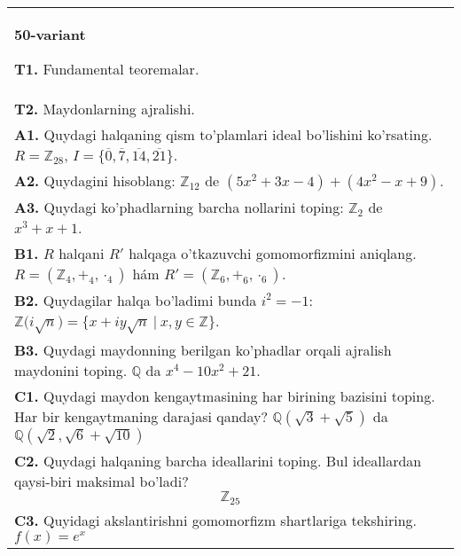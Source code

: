 \documentclass{article}
\begin{document}
\begin{tabular}{m{17cm}}
\textbf{50-variant}
\newline

\textbf{T1.} Fundamental teoremalar. \\
\textbf{T2.} Maydonlarning ajralishi. \\
\textbf{A1.} Quydagi halqaning qism to'plamlari ideal bo'lishini ko'rsating.
\(R = \mathbb{Z}_{28}\), \(I = \{\overline{0},\overline{7},\overline{14},\overline{21}\}\). \\
\textbf{A2.} Quydagini hisoblang:
\(\mathbb{Z}_{12}\) de \(\left( 5x^{2} + 3x - 4 \right) + \left( 4x^{2} - x + 9 \right)\). \\
\textbf{A3.} Quydagi ko'phadlarning barcha nollarini toping:
\(\mathbb{Z}_{2}\) de \(x^{3} + x + 1\). \\
\textbf{B1.} \(R\) halqani \(R'\) halqaga o'tkazuvchi gomomorfizmini aniqlang.
\(R = (\mathbb{Z}_{4}, +_{4}, \cdot_{4})\) hám \(R' = (\mathbb{Z}_{6}, +_{6}, \cdot_{6})\). \\
\textbf{B2.} Quydagilar halqa bo'ladimi bunda \(i^{2} = - 1\):
\(\mathbb{Z(}i\sqrt{n}) = \{ x + iy\sqrt{n}\ |\ x,y \in \mathbb{Z\}}\). \\
\textbf{B3.} Quydagi maydonning berilgan ko'phadlar orqali ajralish maydonini toping.
\(\mathbb{Q}\) da \(x^{4} - 10x^{2} + 21\). \\
\textbf{C1.} Quydagi maydon kengaytmasining har birining bazisini toping. Har bir kengaytmaning darajasi qanday?
\(\mathbb{Q}\left( \sqrt{3} + \sqrt{5} \right)\) da \(\mathbb{Q}\left( \sqrt{2},\sqrt{6} + \sqrt{10} \right)\) \\
\textbf{C2.} Quydagi halqaning barcha ideallarini toping. Bul ideallardan qaysi-biri maksimal bo'ladi?
\[\mathbb{Z}_{25}\] \\
\textbf{C3.} Quyidagi akslantirishni gomomorfizm shartlariga tekshiring. \(f(x) = e^{x}\) \\

\end{tabular}
\vspace{1cm}
\end{document}
